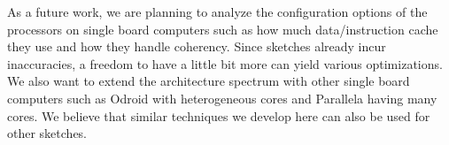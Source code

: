 \documentclass[10pt, conference, compsocconf]{IEEEtran}
\begin{document}
As a future work, we are planning to analyze the configuration options of the processors on single board computers such as how much data/instruction cache they use and how they handle coherency. Since sketches already incur inaccuracies, a freedom to have a little bit more can yield various optimizations. We also want to extend the architecture spectrum with other single board computers such as Odroid with heterogeneous cores and Parallela having many cores. We believe that similar techniques we develop here can also be used for other sketches. 




    
\end{document}
